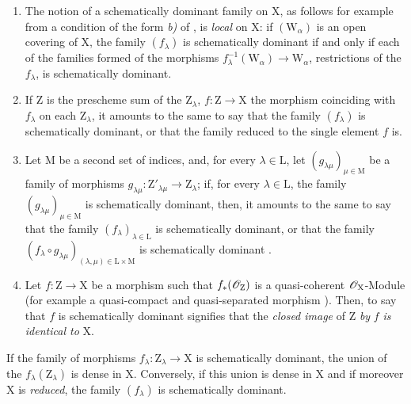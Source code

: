 \begin{remarks}[11.10.3]
\label{IV.11.10.3}
\medskip\noindent
\begin{enumerate}[label=(\roman*)]
  \item The notion of a schematically dominant family on $\mathrm{X}$, as follows for example from a condition of the form \emph{b)} of , is \emph{local} on $\mathrm{X}$: if $(\mathrm{W}_\alpha)$ is an open covering of $\mathrm{X}$, the family $(f_\lambda)$ is schematically dominant if and only if each of the families formed of the morphisms $f_\lambda^{-1}(\mathrm{W}_\alpha)\to\mathrm{W}_\alpha$, restrictions of the $f_\lambda$, is schematically dominant.
  \item If $\mathrm{Z}$ is the prescheme sum of the $\mathrm{Z}_\lambda$, $f:\mathrm{Z}\to\mathrm{X}$ the morphism coinciding with $f_\lambda$ on each $\mathrm{Z}_\lambda$, it amounts to the same to say that the family $(f_\lambda)$ is schematically dominant, or that the family reduced to the single element $f$ is.
  \item Let $\mathrm{M}$ be a second set of indices, and, for every $\lambda\in\mathrm{L}$, let $(g_{\lambda\mu})_{\mu\in\mathrm{M}}$ be a family of morphisms $g_{\lambda\mu}:\mathrm{Z}'_{\lambda\mu}\to\mathrm{Z}_\lambda$; if, for every $\lambda\in\mathrm{L}$, the family $(g_{\lambda\mu})_{\mu\in\mathrm{M}}$ is schematically dominant, then, it amounts to the same to say that the family $(f_\lambda)_{\lambda\in\mathrm{L}}$ is schematically dominant, or that the family $(f_\lambda\circ g_{\lambda\mu})_{(\lambda,\mu)\in\mathrm{L}\times\mathrm{M}}$ is schematically dominant .
  \item Let $f:\mathrm{Z}\to\mathrm{X}$ be a morphism such that $f_*(\mathscr{O}_\mathrm{Z})$ is a quasi-coherent $\mathscr{O}_\mathrm{X}$-Module (for example a quasi-compact and quasi-separated morphism ).
  Then, to say that $f$ is schematically dominant signifies that the \emph{closed image} of $\mathrm{Z}$ \emph{by} $f$  \emph{is identical to} $\mathrm{X}$.
\end{enumerate}
\end{remarks}

\begin{proposition}[11.10.4]
\label{IV.11.10.4}
If the family of morphisms $f_\lambda:\mathrm{Z}_\lambda\to\mathrm{X}$ is schematically dominant, the union of the $f_\lambda(\mathrm{Z}_\lambda)$ is dense in $\mathrm{X}$.
Conversely, if this union is dense in $\mathrm{X}$ and if moreover $\mathrm{X}$ is \emph{reduced}, the family $(f_\lambda)$ is schematically dominant.
\end{proposition}

